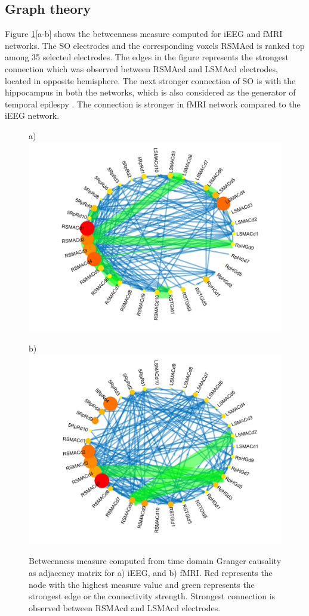 \subsection{Graph theory}
Figure \ref{fig:betweenness_fmri_eeg}[a-b] shows the betweenness measure computed for iEEG and fMRI networks. The SO electrodes and the corresponding voxels RSMAcd is ranked top among 35 selected electrodes. The edges in the figure represents the strongest connection which was observed between RSMAcd and LSMAcd electrodes, located in opposite hemisphere. The next stronger connection of SO is with the hippocampus in both the networks, which is also considered as the generator of temporal epilespy \citep{avoli2007epileptic}. The connection is stronger in fMRI network compared to the iEEG network.


\begin{figure}%
    \centering
    a) {{\includegraphics[width=13cm]{Plots/Patient_C_betweenness_ieeg.jpg} }}%
    
    b) {{\includegraphics[width=13cm]{Plots/Patient_C_betweenness_fmri.jpg} }}%
    \caption{Betweenness measure computed from time domain Granger causality as adjacency matrix for a) iEEG, and b) fMRI. Red represents the node with the highest measure value and green represents the strongest edge or the connectivity strength. Strongest connection is observed between RSMAcd and LSMAcd electrodes.}%
    \label{fig:betweenness_fmri_eeg}%
\end{figure}


